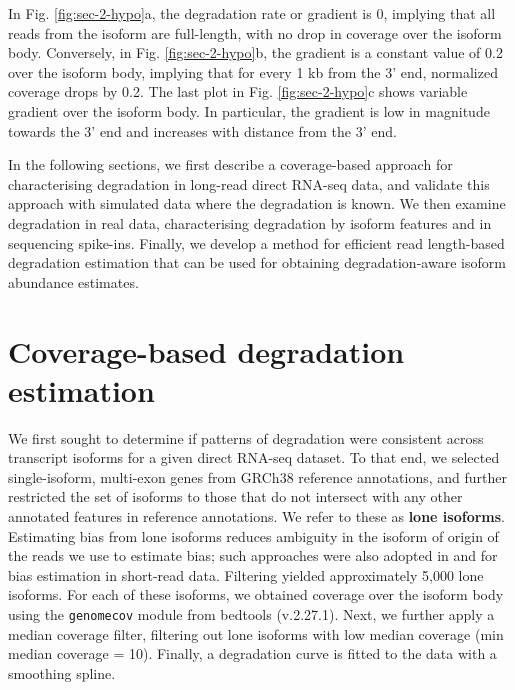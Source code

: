 In Fig. \ref{fig:sec-2-hypo}a, the degradation rate or gradient is 0, implying that all reads from the isoform are full-length, with no drop in coverage over the isoform body. Conversely, in Fig. \ref{fig:sec-2-hypo}b, the gradient is a constant value of 0.2 over the isoform body, implying that for every 1 kb from the 3' end, normalized coverage drops by 0.2. The last plot in Fig. \ref{fig:sec-2-hypo}c shows variable gradient over the isoform body. In particular, the gradient is low in magnitude towards the 3' end and increases with distance from the 3' end.  

In the following sections, we first describe a coverage-based approach for characterising degradation in long-read direct RNA-seq data, and validate this approach with simulated data where the degradation is known. We then examine degradation in real data, characterising degradation by isoform features and in sequencing spike-ins. Finally, we develop a method for efficient read length-based degradation estimation that can be used for obtaining degradation-aware isoform abundance estimates.

\section{Coverage-based degradation estimation}\label{sec:deg-est}

We first sought to determine if patterns of degradation were consistent across transcript isoforms for a given direct RNA-seq dataset. To that end, we selected single-isoform, multi-exon genes from GRCh38 reference annotations, and further restricted the set of isoforms to those that do not intersect with any other annotated features in reference annotations. We refer to these as \textbf{lone isoforms}. Estimating bias from lone isoforms reduces ambiguity in the isoform of origin of the reads we use to estimate bias; such approaches were also adopted in \cite{Roberts2011} and \cite{Love2016} for bias estimation in short-read data. Filtering yielded approximately 5,000 lone isoforms. For each of these isoforms, we obtained coverage over the isoform body using the \texttt{genomecov} module from bedtools (v.2.27.1). Next, we further apply a median coverage filter, filtering out lone isoforms with low median coverage (min median coverage = 10). Finally, a degradation curve is fitted to the data with a smoothing spline.  

